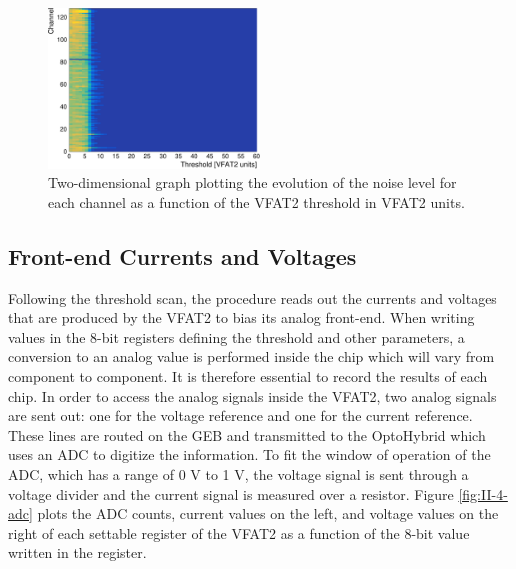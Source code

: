       \begin{figure}[h!]
        \centering
        \includegraphics[width=0.5\textwidth]{img/plots/cThreshold_Channel-crop}
        \caption{Two-dimensional graph plotting the evolution of the noise level for each channel as a function of the VFAT2 threshold in VFAT2 units.}
        \label{fig:II-4-threshold}
      \end{figure}

    \subsection{Front-end Currents and Voltages}

      Following the threshold scan, the procedure reads out the currents and voltages that are produced by the VFAT2 to bias its analog front-end. When writing values in the 8-bit registers defining the threshold and other parameters, a conversion to an analog value is performed inside the chip which will vary from component to component. It is therefore essential to record the results of each chip. In order to access the analog signals inside the VFAT2, two analog signals are sent out: one for the voltage reference and one for the current reference. These lines are routed on the GEB and transmitted to the OptoHybrid which uses an ADC to digitize the information. To fit the window of operation of the ADC, which has a range of 0 V to 1 V, the voltage signal is sent through a voltage divider and the current signal is measured over a resistor. Figure \ref{fig:II-4-adc} plots the ADC counts, current values on the left, and voltage values on the right of each settable register of the VFAT2 as a function of the 8-bit value written in the register. \\

